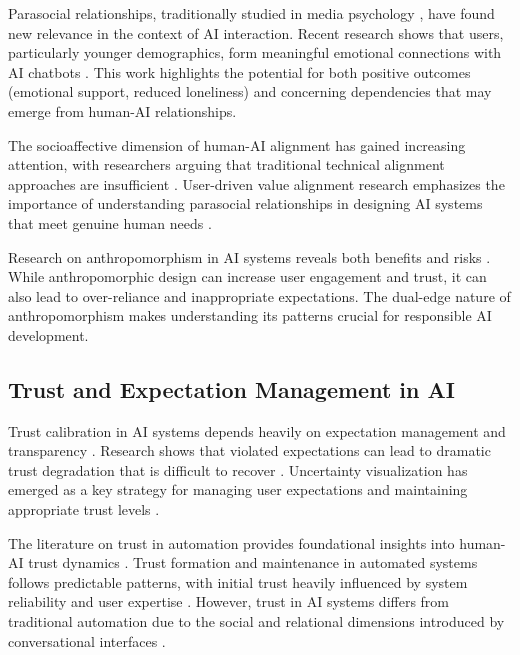 \documentclass{article}
\begin{document}
Parasocial relationships, traditionally studied in media psychology \citep{rubin2019parasocial}, have found new relevance in the context of AI interaction. Recent research shows that users, particularly younger demographics, form meaningful emotional connections with AI chatbots \citep{edwards2024parasocial}. This work highlights the potential for both positive outcomes (emotional support, reduced loneliness) and concerning dependencies that may emerge from human-AI relationships.

The socioaffective dimension of human-AI alignment has gained increasing attention, with researchers arguing that traditional technical alignment approaches are insufficient \citep{kirk2025socioaffective}. User-driven value alignment research emphasizes the importance of understanding parasocial relationships in designing AI systems that meet genuine human needs \citep{fan2025alignment}.

Research on anthropomorphism in AI systems reveals both benefits and risks \citep{pnas2025anthro, envsustain2025anthro}. While anthropomorphic design can increase user engagement and trust, it can also lead to over-reliance and inappropriate expectations. The dual-edge nature of anthropomorphism makes understanding its patterns crucial for responsible AI development.

\subsection{Trust and Expectation Management in AI}

Trust calibration in AI systems depends heavily on expectation management and transparency \citep{amershi2019guidelines, yin2019understanding}. Research shows that violated expectations can lead to dramatic trust degradation that is difficult to recover \citep{lai2019human, kizilcec2016much}. Uncertainty visualization has emerged as a key strategy for managing user expectations and maintaining appropriate trust levels \citep{kay2016uncertainty, reyes2025uncertainty}.

The literature on trust in automation provides foundational insights into human-AI trust dynamics \citep{lee2004trust, hoff2015trust}. Trust formation and maintenance in automated systems follows predictable patterns, with initial trust heavily influenced by system reliability and user expertise \citep{parasuraman2000designing}. However, trust in AI systems differs from traditional automation due to the social and relational dimensions introduced by conversational interfaces \citep{muir1996trust}.
\end{document}
